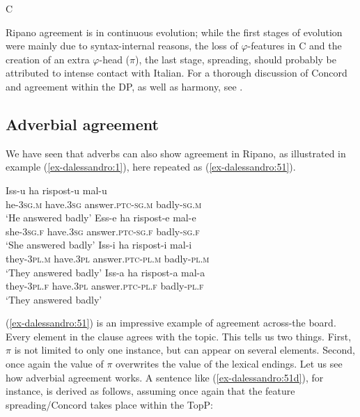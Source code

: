 \documentclass[output=paper
,modfonts
,nonflat]{langsci/langscibook}
\begin{document}
\begin{exe}
\ex C   
\end{exe}
Ripano agreement is in continuous evolution; while the first stages of evolution were mainly due to syntax-internal reasons, the loss of $\varphi $-features in C and the creation of an extra $\varphi $-head ($\pi $), the last stage, spreading, should probably be attributed to intense contact with Italian. For a thorough discussion of Concord and agreement within the DP, as well as harmony, see \citet{Paciaroni2017}. 

\subsection{Adverbial agreement} \label{sec-dalessandro:5.4}
We have seen that adverbs can also show agreement in Ripano, as illustrated in example (\ref{ex-dalessandro:1}), here repeated as (\ref{ex-dalessandro:51}).

\begin{exe}
	\ex \label{ex-dalessandro:51}\citet[8]{Burroni_Et_Al2016} \xlist
	\ex 
	\gll Iss-u    ha    rispost-u     mal-u\\
	he-3\textsc{sg.m}  have.\textsc{3sg}  answer.\textsc{ptc-sg.m}  badly-\textsc{sg.m}\\
	\glt `He answered badly' 
	\ex
	\gll Ess-e    ha    rispost-e     mal-e\\
	she-\textsc{3sg.f}  have.\textsc{3sg}  answer\textsc{.ptc-sg.f}  badly-\textsc{sg.f}\\
	\glt `She answered badly' 
	\ex
	\gll Iss-i    ha     rispost-i    mal-i\\
	they-\textsc{3pl.m} have.\textsc{3pl} answer.\textsc{ptc-pl.m}  badly-\textsc{pl.m}\\
	\glt `They answered badly' 
	\ex \label{ex-dalessandro:51d}
	\gll Iss-a    ha    rispost-a    mal-a\\
	they-\textsc{3pl.f} have.\textsc{3pl} answer.\textsc{ptc-pl.f}  badly-\textsc{pl.f}\\
	\glt `They answered badly' 
	\endxlist
\end{exe}
(\ref{ex-dalessandro:51}) is an impressive example of agreement across-the board. Every element in the clause agrees with the topic.
This tells us two things. First, $\pi $ is not limited to only one instance, but can appear on several elements. Second, once again the value of $\pi $ overwrites the value of the lexical endings.
Let us see how adverbial agreement works. A sentence like (\ref{ex-dalessandro:51d}), for instance, is derived as follows, assuming once again that the feature spreading/Concord takes place within the TopP:
\end{document}
